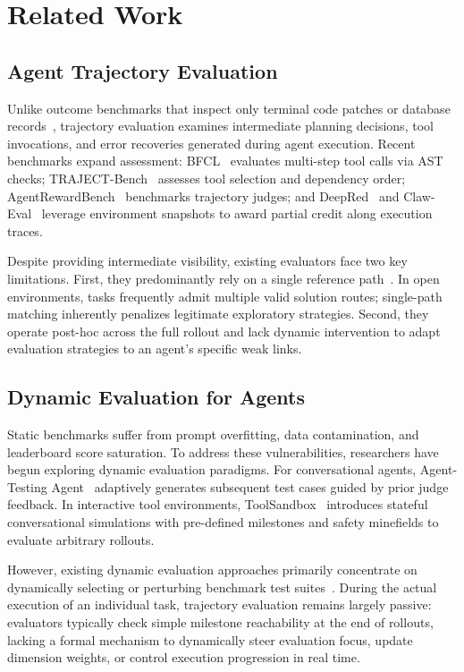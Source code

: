 \section{Related Work}
\label{sec:related_work}

\subsection{Agent Trajectory Evaluation}
Unlike outcome benchmarks that inspect only terminal code patches or database records~\citep{jimenez2024swebench,qin2023toolllm,liu2023agentbench,zhou2024webarena}, trajectory evaluation examines intermediate planning decisions, tool invocations, and error recoveries generated during agent execution. Recent benchmarks expand assessment: BFCL~\citep{patil2025bfcl} evaluates multi-step tool calls via AST checks; TRAJECT-Bench~\citep{trajectbench2025} assesses tool selection and dependency order; AgentRewardBench~\citep{agentrewardbench2025} benchmarks trajectory judges; and DeepRed~\citep{deepred2026} and Claw-Eval~\citep{claweval2026} leverage environment snapshots to award partial credit along execution traces.

Despite providing intermediate visibility, existing evaluators face two key limitations. First, they predominantly rely on a single reference path~\citep{qian2024agentprocessbench}. In open environments, tasks frequently admit multiple valid solution routes; single-path matching inherently penalizes legitimate exploratory strategies. Second, they operate post-hoc across the full rollout and lack dynamic intervention to adapt evaluation strategies to an agent's specific weak links.

\subsection{Dynamic Evaluation for Agents}
Static benchmarks suffer from prompt overfitting, data contamination, and leaderboard score saturation. To address these vulnerabilities, researchers have begun exploring dynamic evaluation paradigms. For conversational agents, Agent-Testing Agent~\citep{agenttestingagent2026} adaptively generates subsequent test cases guided by prior judge feedback. In interactive tool environments, ToolSandbox~\citep{gu2024toolsandbox} introduces stateful conversational simulations with pre-defined milestones and safety minefields to evaluate arbitrary rollouts.

However, existing dynamic evaluation approaches primarily concentrate on dynamically selecting or perturbing benchmark test suites~\citep{gu2024toolsandbox,agenttestingagent2026}. During the actual execution of an individual task, trajectory evaluation remains largely passive: evaluators typically check simple milestone reachability at the end of rollouts, lacking a formal mechanism to dynamically steer evaluation focus, update dimension weights, or control execution progression in real time.


